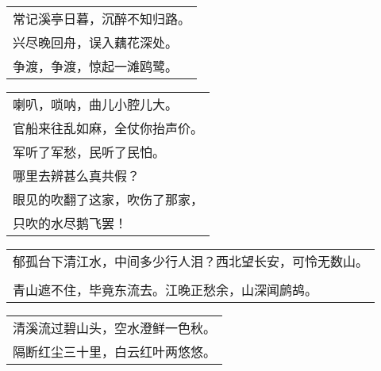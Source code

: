 \noindent\begin{minipage}{\linewidth}
  \vskip-3pt\begin{table}[H]
    \centering
    \begin{tabular}{@{}l@{}}
常记溪亭日暮，沉醉不知归路。\\
兴尽晚回舟，误入藕花深处。\\
争渡，争渡，惊起一滩鸥鹭。
    \end{tabular}
  \end{table}
\end{minipage}
\vspace{1cm}


\noindent\begin{minipage}{\linewidth}
  \vskip-3pt\begin{table}[H]
    \centering
    \begin{tabular}{@{}l@{}}
喇叭，唢呐，曲儿小腔儿大。\\
官船来往乱如麻，全仗你抬声价。\\
军听了军愁，民听了民怕。\\
哪里去辨甚么真共假？\\
眼见的吹翻了这家，吹伤了那家，\\
只吹的水尽鹅飞罢！
    \end{tabular}
  \end{table}
\end{minipage}
\vspace{1cm}


\noindent\begin{minipage}{\linewidth}
  \vskip-3pt\begin{table}[H]
    \centering
    \begin{tabular}{@{}l@{}}
郁孤台下清江水，中间多少行人泪？西北望长安，可怜无数山。\\
\\
青山遮不住，毕竟东流去。江晚正愁余，山深闻鹧鸪。
    \end{tabular}
  \end{table}
\end{minipage}
\vspace{1cm}


\noindent\begin{minipage}{\linewidth}
  \vskip-3pt\begin{table}[H]
    \centering
    \begin{tabular}{@{}l@{}}
清溪流过碧山头，空水澄鲜一色秋。\\
隔断红尘三十里，白云红叶两悠悠。
    \end{tabular}
  \end{table}
\end{minipage}
\vspace{1cm}


